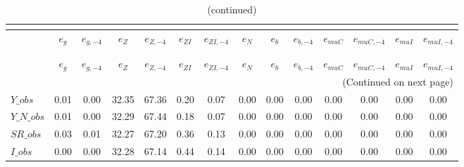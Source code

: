  
\begin{center}
\begin{longtable}{lccccccccccccc} 
\caption{VARIANCE DECOMPOSITION (in percent)}\\
 \label{Table:th_var_decomp_uncond}\\
\toprule 
$               $	 & 	 $           {e_g}$	 & 	 $      {e_{g,-4}}$	 & 	 $           {e_Z}$	 & 	 $      {e_{Z,-4}}$	 & 	 $        {e_{ZI}}$	 & 	 $     {e_{ZI,-4}}$	 & 	 $           {e_N}$	 & 	 $           {e_b}$	 & 	 $      {e_{b,-4}}$	 & 	 $       {e_{muC}}$	 & 	 $    {e_{muC,-4}}$	 & 	 $       {e_{muI}}$	 & 	 $    {e_{muI,-4}}$\\
\midrule \endfirsthead 
\caption{(continued)}\\
 \toprule \\ 
$               $	 & 	 $           {e_g}$	 & 	 $      {e_{g,-4}}$	 & 	 $           {e_Z}$	 & 	 $      {e_{Z,-4}}$	 & 	 $        {e_{ZI}}$	 & 	 $     {e_{ZI,-4}}$	 & 	 $           {e_N}$	 & 	 $           {e_b}$	 & 	 $      {e_{b,-4}}$	 & 	 $       {e_{muC}}$	 & 	 $    {e_{muC,-4}}$	 & 	 $       {e_{muI}}$	 & 	 $    {e_{muI,-4}}$\\
\midrule \endhead 
\midrule \multicolumn{14}{r}{(Continued on next page)} \\ \bottomrule \endfoot 
\bottomrule \endlastfoot 
$Y\_obs         $	 & 	            0.01	 & 	            0.00	 & 	           32.35	 & 	           67.36	 & 	            0.20	 & 	            0.07	 & 	            0.00	 & 	            0.00	 & 	            0.00	 & 	            0.00	 & 	            0.00	 & 	            0.00	 & 	            0.00 \\ 
$Y\_N\_obs      $	 & 	            0.01	 & 	            0.00	 & 	           32.29	 & 	           67.44	 & 	            0.18	 & 	            0.07	 & 	            0.00	 & 	            0.00	 & 	            0.00	 & 	            0.00	 & 	            0.00	 & 	            0.00	 & 	            0.00 \\ 
$SR\_obs        $	 & 	            0.03	 & 	            0.01	 & 	           32.27	 & 	           67.20	 & 	            0.36	 & 	            0.13	 & 	            0.00	 & 	            0.00	 & 	            0.00	 & 	            0.00	 & 	            0.00	 & 	            0.00	 & 	            0.00 \\ 
$I\_obs         $	 & 	            0.00	 & 	            0.00	 & 	           32.28	 & 	           67.14	 & 	            0.44	 & 	            0.14	 & 	            0.00	 & 	            0.00	 & 	            0.00	 & 	            0.00	 & 	            0.00	 & 	            0.00	 & 	            0.00 \\ 

\end{longtable}
\end{center}
